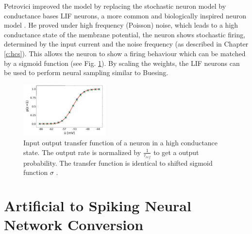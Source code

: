 Petrovici improved the model by replacing the stochastic neuron model by conductance bases LIF neurons, a more common and biologically inspired neuron model \cite{Petrovici2016}.
He proved under high frequency (Poisson) noise, which leads to a high conductance state of the membrane potential, the neuron shows stochastic firing, determined by the input current and the noise frequency (as described in Chapter \ref{c:hcs}).
This allows the neuron to show a firing behaviour which can be matched by a sigmoid function (see Fig. \ref{fig:snnsamp4}).  
By scaling the weights, the LIF neurons can be used to perform neural sampling similar to Buesing.

\begin{figure}
	\centering
    	\includegraphics[width=0.4\textwidth]{imgs/snn_sample5.png} 
    \caption[Input output transfer function of a neuron in a high conductance state.]{Input output transfer function of a neuron in a high conductance state. The output rate is normalized by $\frac{1}{\tau_{ref}}$ to get a output probability. The transfer function is identical to shifted sigmoid function $\sigma$  \cite{Petrovici2016}.}
	\label{fig:snnsamp4}
\end{figure}

\section{Artificial to Spiking Neural Network Conversion} \label{c:nnconversion}

